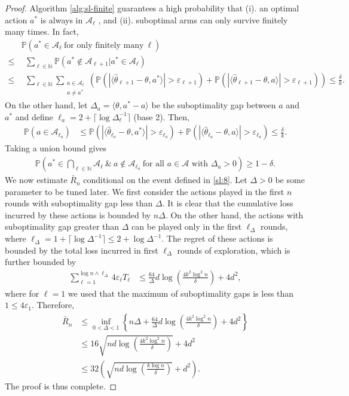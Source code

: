 \documentclass[10pt,a4article]{amsart}
\numberwithin{equation}{section}
\theoremstyle{plain}
\theoremstyle{definition}
\def\N{{\mathbb N}}
\def\P{{\mathbb P}}
\def\e{{\varepsilon}}
\def\t{{\theta}}
\begin{document}
\begin{proof}
Algorithm \ref{alg:sl-finite} guarantees a high probability that (i). an optimal action $a^*$ is always in $\mathcal A_\ell$ , and (ii). suboptimal arms can only survive finitely many times. In fact, 
\begin{align*}
&\P\left(a^*\in\mathcal A_\ell\  \text{for only finitely many}\ \ell \right)\\
\leq&\ \  \sum_{\ell\in\N}\P\left(a^*\notin\mathcal A_{\ell+1}|a^*\in\mathcal A_{\ell}\right)\\
\leq&\ \ \sum_{\ell\in\N}\sum_{\substack{a\in\mathcal A_\ell\\ a\neq a^*}}\left(\P\left(|\langle\hat{\t}_{\ell+1}-\t, a^*\rangle|>\e_{\ell+1}\right)+\P\left(|\langle\hat{\t}_{\ell+1}-\t, a\rangle|>\e_{\ell+1}\right)\right)\leq\frac{\delta}{k}.
\end{align*}
On the other hand, let $\Delta_a = \langle\t, a^*-a\rangle$ be the suboptimality gap between $a$ and $a^*$ and define $\ell_a = 2+\lceil\log\Delta_\ell^{-1}\rceil$ (base 2). Then, 
\begin{align*}
\P\left(a\in\mathcal A_{\ell_a}\right)&\leq \P\left(|\langle\hat{\t}_{\ell_a}-\t, a^*\rangle|>\e_{\ell_a}\right)+\P\left(|\langle\hat{\t}_{\ell_a}-\t, a\rangle|>\e_{\ell_a}\right)\leq \frac{\delta}{k}. 
\end{align*}
Taking a union bound gives
\begin{align}
\P\left(a^*\in\bigcap_{\ell\in\N}\mathcal A_\ell\ \&\ a\notin \mathcal A_{\ell_a}\ \text{for all $a\in\mathcal A$ with $\Delta_a>0$} \right)\geq 1-\delta. \label{sl:8}
\end{align}
We now estimate $\bar{R}_n$ conditional on the event defined in \eqref{sl:8}. Let $\Delta>0$ be some parameter to be tuned later. We first consider the actions played in the first $n$ rounds with suboptimality gap less than $\Delta$. It is clear that the cumulative loss incurred by these actions is bounded by $n\Delta$. On the other hand, the actions with suboptimality gap greater than $\Delta$ can be played only in the first $\ell_\Delta$ rounds, where $\ell_\Delta = 1+\lceil\log\Delta^{-1}\rceil\leq 2+\log\Delta^{-1}$. The regret of these actions is bounded by the total loss incurred in first $\ell_\Delta$ rounds of exploration, which is further bounded by  
\begin{align*}
\sum_{\ell = 1}^{\log n\wedge \ell_\Delta}4\e_\ell T_\ell &\leq \frac{64}{\Delta}d\log\left(\frac{4k^2\log^2 n}{\delta}\right) + 4d^2,
\end{align*} 
where for $\ell=1$ we used that the maximum of suboptimality gaps is less than $1\leq 4\e_1$. Therefore, 
\begin{align*}
\bar{R}_n&\leq\inf_{0<\Delta<1}\left\{n\Delta+\frac{64}{\Delta}d\log\left(\frac{4k^2\log^2 n}{\delta}\right)+4d^2\right\}\\
&\leq 16\sqrt{nd\log\left(\frac{4k^2\log^2 n}{\delta}\right)}+4d^2\\
&\leq 32\left(\sqrt{nd\log\left(\frac{k\log n}{\delta}\right)}+d^2\right). 
\end{align*}
The proof is thus complete. 
\end{proof}
\end{document}
